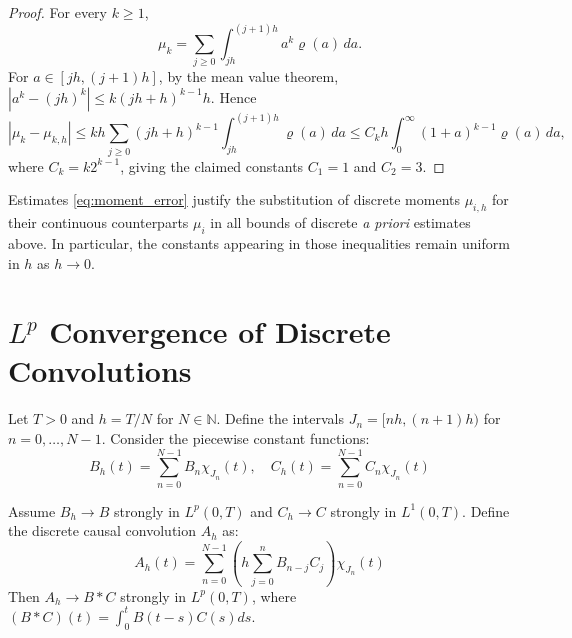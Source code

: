 \documentclass[]{jnsao}
\begin{document}
	\begin{proof}
		For every \(k\ge1\),
		\[
		\mu_k
		=\sum_{j\ge0}\int_{jh}^{(j+1)h}a^k\varrho(a)\,da.
		\]
		For \(a\in[jh,(j+1)h]\), by the mean value theorem,
		\(
		|a^k-(jh)^k|
		\le k (jh+h)^{k-1} h.
		\)
		Hence
		\[
		|\mu_k-\mu_{k,h}|
		\le
		k h \sum_{j\ge0}(jh+h)^{k-1}
		\int_{jh}^{(j+1)h}\varrho(a)\,da
		\le
		C_k h\int_0^{\infty}(1+a)^{k-1}\varrho(a)\,da,
		\]
		where \(C_k=k2^{k-1}\), giving the claimed constants
		\(C_1=1\) and \(C_2=3\).
	\end{proof}
	
	
	\begin{remark}
		Estimates \eqref{eq:moment_error}
		justify the substitution of discrete moments
		\(\mu_{i,h}\) for their continuous counterparts
		\(\mu_i\) in all bounds of discrete {\em a priori} estimates above. 
		In particular, the constants appearing in those inequalities
		remain uniform in \(h\) as \(h\to0\).
	\end{remark}
	

	
\section{$L^p$ Convergence of Discrete Convolutions}\label{sec:discrete_convolution}

Let $T > 0$ and $h = T/N$ for $N \in \mathbb{N}$. Define the intervals $J_n = [nh, (n+1)h)$ for $n=0, \dots, N-1$. 
Consider the piecewise constant functions:
\[ B_h(t) = \sum_{n=0}^{N-1} B_n \chi_{J_n}(t), \quad C_h(t) = \sum_{n=0}^{N-1} C_n \chi_{J_n}(t) \]

\begin{proposition}\label{prop:discrete_convolution_convergence}
Assume $B_h \to B$ strongly in $L^p(0,T)$ and $C_h \to C$ strongly in $L^1(0,T)$. 
Define the discrete causal convolution $A_h$ as:
\[ A_h(t) = \sum_{n=0}^{N-1} \left( h \sum_{j=0}^n B_{n-j} C_j \right) \chi_{J_n}(t) \]
Then $A_h \to B * C$ strongly in $L^p(0,T)$, where $(B * C)(t) = \int_0^t B(t-s)C(s)ds$.
\end{proposition}
\end{document}
